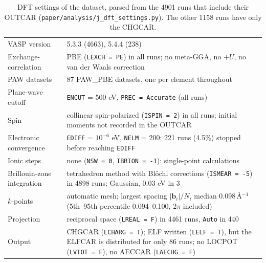 \begin{table}[htbp]
\centering
\caption{DFT settings of the dataset, parsed from the 4901 runs that include their OUTCAR (\texttt{paper/analysis/j\_dft\_settings.py}). The other 1158 runs have only the CHGCAR.}
\label{tab:si-dft}
\small
\begin{tabular}{p{4cm}p{10.5cm}}
\toprule
VASP version & 5.3.3 (4663), 5.4.4 (238) \\
Exchange-correlation & PBE (\texttt{LEXCH = PE}) in all runs; no meta-GGA, no $+U$, no van der Waals correction \\
PAW datasets & 87 PAW\_PBE datasets, one per element throughout \\
Plane-wave cutoff & \texttt{ENCUT} = 500 eV, \texttt{PREC = Accurate} (all runs) \\
Spin & collinear spin-polarized (\texttt{ISPIN = 2}) in all runs; initial moments not recorded in the OUTCAR \\
Electronic convergence & \texttt{EDIFF} = $10^{-6}$ eV, \texttt{NELM} = 200; 221 runs (4.5\%) stopped before reaching \texttt{EDIFF} \\
Ionic steps & none (\texttt{NSW = 0}, \texttt{IBRION = -1}): single-point calculations \\
Brillouin-zone integration & tetrahedron method with Bl\"ochl corrections (\texttt{ISMEAR = -5}) in 4898 runs; Gaussian, 0.03 eV in 3 \\
$k$-points & automatic mesh; largest spacing $|\mathbf b_i|/N_i$ median 0.098\,\AA$^{-1}$ (5th--95th percentile 0.094--0.100, $2\pi$ included) \\
Projection & reciprocal space (\texttt{LREAL = F}) in 4461 runs, \texttt{Auto} in 440 \\
Output & CHGCAR (\texttt{LCHARG = T}); ELF written (\texttt{LELF = T}), but the ELFCAR is distributed for only 86 runs; no LOCPOT (\texttt{LVTOT = F}), no AECCAR (\texttt{LAECHG = F}) \\
\bottomrule
\end{tabular}
\end{table}
